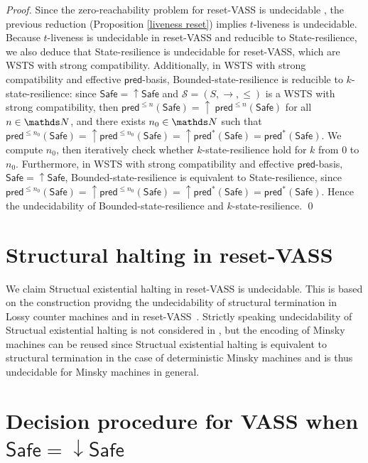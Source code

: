 \documentclass[runningheads]{llncs}
\newcommand{\pred}{\textsf{pred}}
\newcommand{\Safe}{\textsf{Safe}}
\begin{document}
\begin{proof}
Since the zero-reachability problem for reset-VASS is undecidable \cite{dufourd1998reset}, the previous reduction (Proposition \ref{liveness reset}) implies 
{\sc $t$-liveness} is undecidable.
Because
{\sc $t$-liveness} is undecidable in reset-VASS
and reducible to {\sc State-resilience}, we also deduce that {\sc State-resilience} is undecidable for reset-VASS, which are WSTS with strong compatibility.
Additionally, in WSTS with strong compatibility and effective $\pred$-basis, {\sc Bounded-state-resilience} is
reducible to {\sc $k$-state-resilience}:
since $\Safe=\mathop{\uparrow} \Safe$ and
$\mathscr{S}=(S,\rightarrow,\leq)$ is a WSTS with strong 
compatibility, then $\pred^{\leq n}(\Safe)= \mathop{\uparrow}~\pred^{\leq n}(\Safe)$ for all $n \in \N$,
and there exists $n_0 \in \N$ such that 
$\pred^{\leq n_0}(\Safe) = \mathop{\uparrow} \pred^{\leq n_0}(\Safe) = \mathop{\uparrow} \pred^*(\Safe) = \pred^*(\Safe)$.
We compute 
$n_0$, then iteratively check whether $k$-state-resilience 
hold for $k$ from $0$ to $n_0$.  
Furthermore, in WSTS with strong compatibility and effective $\pred$-basis,  $\Safe=\mathop{\uparrow} \Safe$, {\sc Bounded-state-resilience} is equivalent to {\sc State-resilience},
since 
$\pred^{\leq n_0}(\Safe) = \mathop{\uparrow} \pred^{\leq n_0}(\Safe) = {\mathop{\uparrow} \pred^*(\Safe)} = \pred^*(\Safe)$.
Hence the undecidability of {\sc Bounded-state-resilience}
and 
 {\sc $k$-state-resilience}. \qed
\end{proof}


\section{Structural halting in reset-VASS}

We claim {\sc Structual existential halting} in reset-VASS is undecidable.  
This is based on the construction providng the undecidability of structural termination in Lossy counter machines and in reset-VASS~\cite{dufourd1998reset,mayr1998lossy}. Strictly speaking undecidability of
{\sc Structual existential halting} is not considered in
\cite{mayr1998lossy},
but 
the encoding of Minsky machines can be reused
since 
 {\sc Structual existential halting}
 is equivalent to
 structural termination in the case of deterministic Minsky machines and is thus
 undecidable for Minsky machines in general.


\section{Decision procedure for VASS when $\Safe = \mathop{\downarrow} \Safe$}\label{appendix vass}
\end{document}
